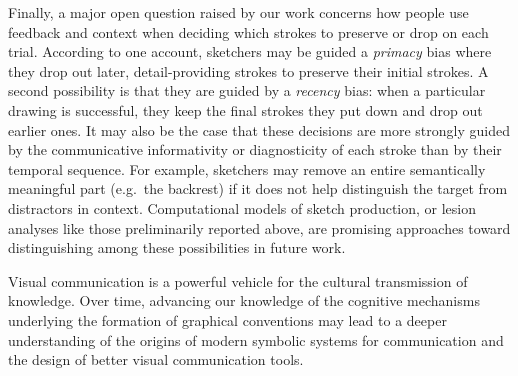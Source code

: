 \documentclass[10pt,letterpaper]{article}
\newcommand{\ndg}[1]{{\textcolor{Green}{[ndg: #1]}}}
\newcommand{\rdh}[1]{\textcolor{Red}{rdh: #1}}
\begin{document}
Finally, a major open question raised by our work concerns how people use feedback and context when deciding which strokes to preserve or drop on each trial.
According to one account, sketchers may be guided a \emph{primacy} bias where they drop out later, detail-providing strokes to preserve their initial strokes.
A second possibility is that they are guided by a \emph{recency} bias: when a particular drawing is successful, they keep the final strokes they put down and drop out earlier ones.
It may also be the case that these decisions are more strongly guided by the communicative informativity or diagnosticity of each stroke than by their temporal sequence.
For example, sketchers may remove an entire semantically meaningful part (e.g.~the backrest) if it does not help distinguish the target from distractors in context. %
Computational models of sketch production, or lesion analyses like those preliminarily reported above, are promising approaches toward distinguishing among these possibilities in future work.

Visual communication is a powerful vehicle for the cultural transmission of knowledge.
Over time, advancing our knowledge of the cognitive mechanisms underlying the formation of graphical conventions
may lead to a deeper understanding of the origins of modern symbolic systems for communication and the design of better visual communication tools.
\end{document}

